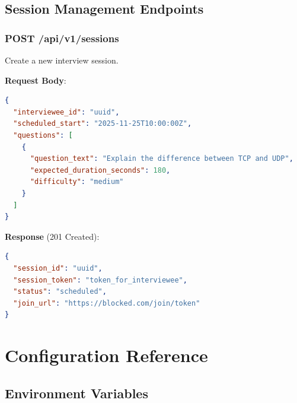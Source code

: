 \documentclass[11pt,letterpaper]{article}
\begin{document}
\subsection{Session Management Endpoints}

\subsubsection{POST /api/v1/sessions}

Create a new interview session.

\textbf{Request Body}:
\begin{lstlisting}[language=json]
{
  "interviewee_id": "uuid",
  "scheduled_start": "2025-11-25T10:00:00Z",
  "questions": [
    {
      "question_text": "Explain the difference between TCP and UDP",
      "expected_duration_seconds": 180,
      "difficulty": "medium"
    }
  ]
}
\end{lstlisting}

\textbf{Response} (201 Created):
\begin{lstlisting}[language=json]
{
  "session_id": "uuid",
  "session_token": "token_for_interviewee",
  "status": "scheduled",
  "join_url": "https://blocked.com/join/token"
}
\end{lstlisting}

\section{Configuration Reference}

\subsection{Environment Variables}
\end{document}
